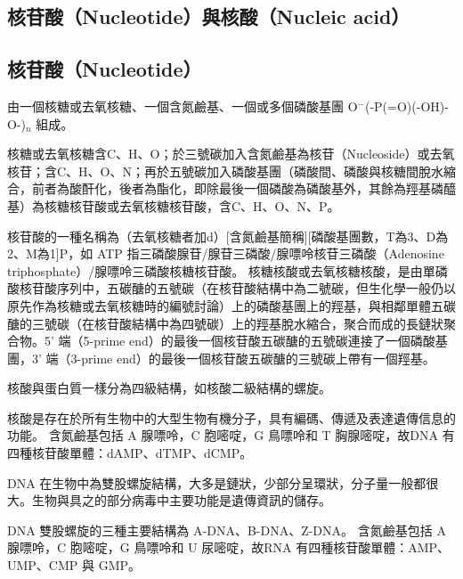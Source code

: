 \documentclass[a4paper,12pt]{report}
\begin{document}
\begin{itemize}
\begin{itemize}
\section{核苷酸（Nucleotide）與核酸（Nucleic acid）}
\subsection{核苷酸（Nucleotide）}
由一個核糖或去氧核糖、一個含氮鹼基、一個或多個磷酸基團 O$^-$(-P(=O)(-OH)-O-)$_n$ 組成。

核糖或去氧核糖含C、H、O；於三號碳加入含氮鹼基為核苷（Nucleoside）或去氧核苷；含C、H、O、N；再於五號碳加入磷酸基團（磷酸間、磷酸與核糖間脫水縮合，前者為酸酐化，後者為酯化，即除最後一個磷酸為磷酸基外，其餘為羥基磷醯基）為核糖核苷酸或去氧核糖核苷酸，含C、H、O、N、P。

核苷酸的一種名稱為（去氧核糖者加d）[含氮鹼基簡稱][磷酸基團數，T為3、D為2、M為1]P，如 ATP 指三磷酸腺苷/腺苷三磷酸/腺嘌呤核苷三磷酸（Adenosine triphosphate）/腺嘌呤三磷酸核糖核苷酸。
核糖核酸或去氧核糖核酸，是由單磷酸核苷酸序列中，五碳醣的五號碳（在核苷酸結構中為二號碳，但生化學一般仍以原先作為核糖或去氧核糖時的編號討論）上的磷酸基團上的羥基，與相鄰單體五碳醣的三號碳（在核苷酸結構中為四號碳）上的羥基脫水縮合，聚合而成的長鏈狀聚合物。5' 端（5-prime end）的最後一個核苷酸五碳醣的五號碳連接了一個磷酸基團，3' 端（3-prime end）的最後一個核苷酸五碳醣的三號碳上帶有一個羥基。

核酸與蛋白質一樣分為四級結構，如核酸二級結構的螺旋。

核酸是存在於所有生物中的大型生物有機分子，具有編碼、傳遞及表達遺傳信息的功能。
含氮鹼基包括 A 腺嘌呤，C 胞嘧啶，G 鳥嘌呤和 T 胸腺嘧啶，故DNA 有四種核苷酸單體：dAMP、dTMP、dCMP。

DNA 在生物中為雙股螺旋結構，大多是鏈狀，少部分呈環狀，分子量一般都很大。生物與具之的部分病毒中主要功能是遺傳資訊的儲存。

DNA 雙股螺旋的三種主要結構為 A-DNA、B-DNA、Z-DNA。
含氮鹼基包括 A 腺嘌呤，C 胞嘧啶，G 鳥嘌呤和 U 尿嘧啶，故RNA 有四種核苷酸單體：AMP、UMP、CMP 與 GMP。


\end{itemize}
\end{itemize}
\end{document}
